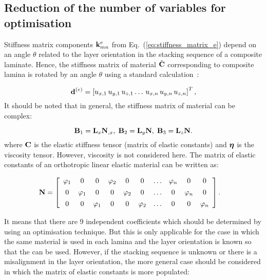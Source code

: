  
\subsection{Reduction of the number of variables for optimisation}
 
 Stiffness matrix components \(\mathbf{k}_{mn}^e\) from 
 Eq.~(\ref{eq:stiffness_matrix_e}) 
 depend on an angle \(\theta\) related to the layer orientation in the stacking sequence 
 of 
 a composite laminate. Hence, the stiffness matrix of material \(\tilde{\mathbf{C}}\) 
 corresponding to composite lamina is rotated by an angle \(\theta\) using a standard 
 calculation~\cite{Bartoli2006,Taupin2011}:
 
\begin{equation}
	 \mathbf{d}^{(e)} =  \left[ u_{x,1} \, u_{y,1} \, u_{z,1} \ldots  \, u_{x,n} \, u_{y,n} \, u_{z,n} \right]^T,
	 \end{equation}
 It should be noted that in general, the stiffness matrix of material can be complex:
 
\begin{equation}
	 \mathbf{B}_1= \mathbf{L}_x \mathbf{N}_{,x},\; \mathbf{B}_2= \mathbf{L}_y \mathbf{N},\; \mathbf{B}_3= \mathbf{L}_z \mathbf{N}.
	 \end{equation}
 where \(\mathbf{C}\) is the elastic stiffness tensor (matrix of elastic constants) and 
 \(\boldsymbol{\eta}\) is the viscosity tensor. However, viscosity is not considered here. The 
 matrix of elastic constants of an orthotropic linear elastic material can be written as:
 
\begin{equation}
	 \begin{split}
	 & \mathbf{N} = \left[\begin{array}{cccccccccc} 
	 \varphi_1 & 0 & 0  & \varphi_2 & 0 & 0& \ldots & \varphi_n & 0 & 0\\[4pt]
	 0&\varphi_1&0 &  0&\varphi_2&0 & \ldots&  0&\varphi_n&0\\[4pt]
	 0 &0&\varphi_1 & 0 &0&\varphi_2 & \ldots& 0 &0&\varphi_n 
	 \end{array} \right]. 
	 \end{split}
	 \end{equation}

 It means that there are 9 independent coefficients which should be determined by using an optimisation technique. But this is only applicable for the case in which the same material is used in each lamina and the layer orientation is known so that the   can be used. However, if the stacking sequence is unknown or there is a misalignment in the layer orientation, the more general case should be considered in which the matrix of elastic constants is more populated:
 	

